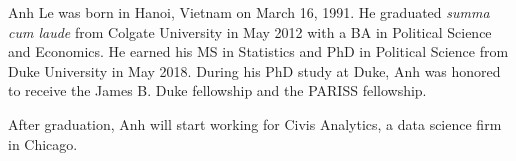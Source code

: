 \biography

Anh Le was born in Hanoi, Vietnam on March 16, 1991. He graduated \textit{summa
  cum laude} from Colgate University in May 2012 with a BA in Political Science
and Economics. He earned his MS in Statistics and PhD in Political Science from
Duke University in May 2018. During his PhD study at Duke, Anh was honored to
receive the James B. Duke fellowship and the PARISS fellowship.

After graduation, Anh will start working for Civis Analytics, a data science
firm in Chicago.
